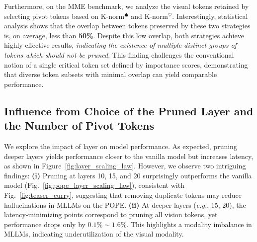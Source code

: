 Furthermore, on the MME benchmark, we analyze the visual tokens retained by selecting pivot tokens based on K-norm$^\spadesuit$ and K-norm$^\heartsuit$. Interestingly, statistical analysis shows that the overlap between tokens preserved by these two strategies is, on average, less than \textbf{50\%}. Despite this low overlap, both strategies achieve highly effective results, {\emph{indicating the existence of multiple distinct groups of tokens which should not be pruned}}. This finding challenges the conventional notion of a single critical token set defined by importance scores, demonstrating that diverse token subsets with minimal overlap can yield comparable performance.


\vspace{-2mm}
\subsection{Influence from Choice of the Pruned Layer and the Number of Pivot Tokens }\label{sec:Layer_and_num}
\vspace{-1mm}
We explore the impact of layer on model performance. As expected, pruning deeper layers yields performance closer to the vanilla model but increases latency, as shown in Figure~\ref{fig:layer_scaling_law}. However, we observe two intriguing findings: \textbf{(i)} Pruning at layers 10, 15, and 20 surprisingly outperforms the vanilla model (Fig.~\ref{fig:pope_layer_scaling_law}), consistent with Fig.~\ref{fig:teaser_curry}, suggesting that removing duplicate tokens may reduce hallucinations in MLLMs on the POPE. \textbf{(ii)} At deeper layers (\emph{e.g.}, 15, 20), the latency-minimizing points correspond to pruning all vision tokens, yet performance drops only by $\mathbf{0.1\%} \mathbf{\sim} \mathbf{1.6\%}$. This highlights a modality imbalance in MLLMs, indicating underutilization of the visual modality.

